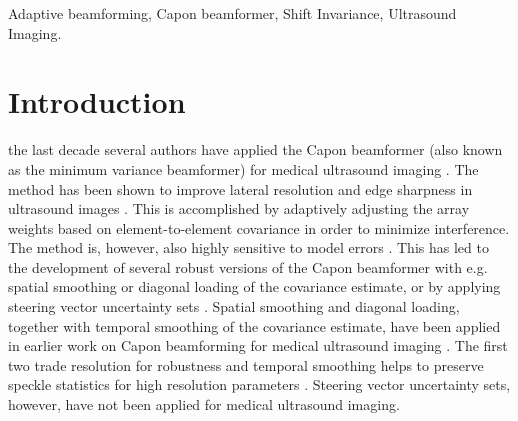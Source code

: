 \documentclass[draftcls]{IEEEtran}
\begin{document}
\begin{IEEEkeywords}
Adaptive beamforming, Capon beamformer, Shift Invariance, Ultrasound Imaging.
\end{IEEEkeywords}






%
\IEEEpeerreviewmaketitle



\section{Introduction}
% 
% 
% 
% 

 the last decade several authors have applied the Capon beamformer (also known as the minimum variance beamformer) for medical ultrasound imaging \cite{Synnevag2007, Vignon2008, Viola}. The method has been shown to improve lateral resolution and edge sharpness in ultrasound images \cite{Synnevag2007, Synnevag2009, Chen2011}. This is accomplished by adaptively adjusting the array weights based on element-to-element covariance in order to minimize interference. The method is, however, also highly sensitive to model errors \cite{Mestre2006, Widrow1982, Wax1996, Wax1996a}. This has led to the development of several robust versions of the Capon beamformer with e.g. spatial smoothing \cite{Shan1985} or diagonal loading \cite{JianLi2003} of the covariance estimate, or by applying steering vector uncertainty sets \cite{Lorenz2005, Rubsamen2013}. Spatial smoothing and diagonal loading, together with temporal smoothing of the covariance estimate, have been applied in earlier work on Capon beamforming for medical ultrasound imaging \cite{Synnevag2009}. The first two trade resolution for robustness and temporal smoothing helps to preserve speckle statistics for high resolution parameters \cite{Synnevag2007a}. Steering vector uncertainty sets, however, have not been applied for medical ultrasound imaging.
\end{document}
